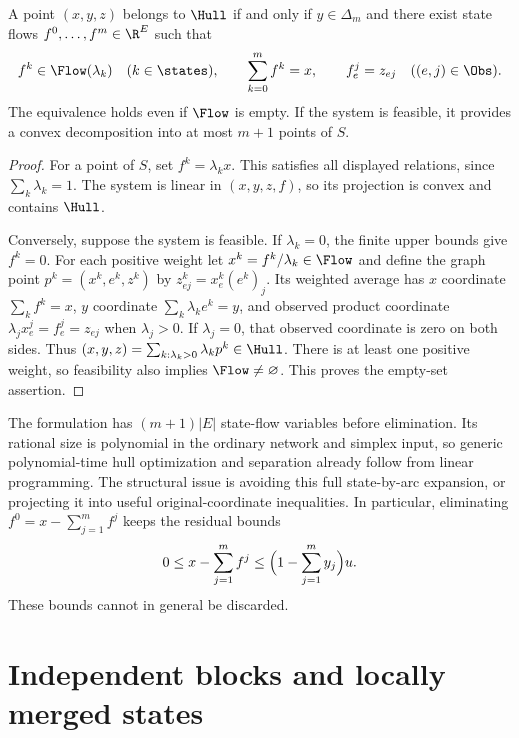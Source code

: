 \begin{proposition}\label{prop:disaggregation}
A point $(x,y,z)$ belongs to $\Hull$ if and only if $y\in\Delta_m$ and
there exist state flows $f^0,\ldots,f^m\in\R^E$ such that
\begin{equation}\label{eq:disaggregation}
 f^k\in\Flow(\lambda_k)\quad(k\in\states),\qquad
 \sum_{k=0}^m f^k=x,\qquad
 f^j_e=z_{ej}\quad((e,j)\in\Obs).
\end{equation}
The equivalence holds even if $\Flow$ is empty. If the system is feasible,
it provides a convex decomposition into at most $m+1$ points of $S$.
\end{proposition}
\begin{proof}
For a point of $S$, set $f^k=\lambda_k x$. This satisfies all displayed
relations, since $\sum_k\lambda_k=1$. The system is linear in
$(x,y,z,f)$, so its projection is convex and contains $\Hull$.

Conversely, suppose the system is feasible. If $\lambda_k=0$, the finite
upper bounds give $f^k=0$. For each positive weight let
$x^k=f^k/\lambda_k\in\Flow$ and define the graph point
$p^k=(x^k,e^k,z^k)$ by
$z^k_{ej}=x^k_e(e^k)_j$. Its weighted average has $x$ coordinate
$\sum_k f^k=x$, $y$ coordinate $\sum_k\lambda_k e^k=y$, and observed
product coordinate $\lambda_j x^j_e=f^j_e=z_{ej}$ when
$\lambda_j>0$. If $\lambda_j=0$, that observed coordinate is zero on both
sides. Thus $(x,y,z)=\sum_{k:\lambda_k>0}\lambda_k p^k\in\Hull$.
There is at least one positive weight, so feasibility also implies
$\Flow\ne\varnothing$. This proves the empty-set assertion.
\end{proof}

The formulation has $(m+1)|E|$ state-flow variables before elimination.
Its rational size is polynomial in the ordinary network and simplex input,
so generic polynomial-time hull optimization and separation already follow
from linear programming. The structural issue is avoiding this full
state-by-arc expansion, or projecting it into useful original-coordinate
inequalities. In particular, eliminating $f^0=x-\sum_{j=1}^m f^j$ keeps
the residual bounds
\begin{equation}\label{eq:residual-bounds}
 0\le x-\sum_{j=1}^m f^j\le
       \Bigl(1-\sum_{j=1}^m y_j\Bigr)u.
\end{equation}
These bounds cannot in general be discarded.

\section{Independent blocks and locally merged states}\label{sec:blocks}

